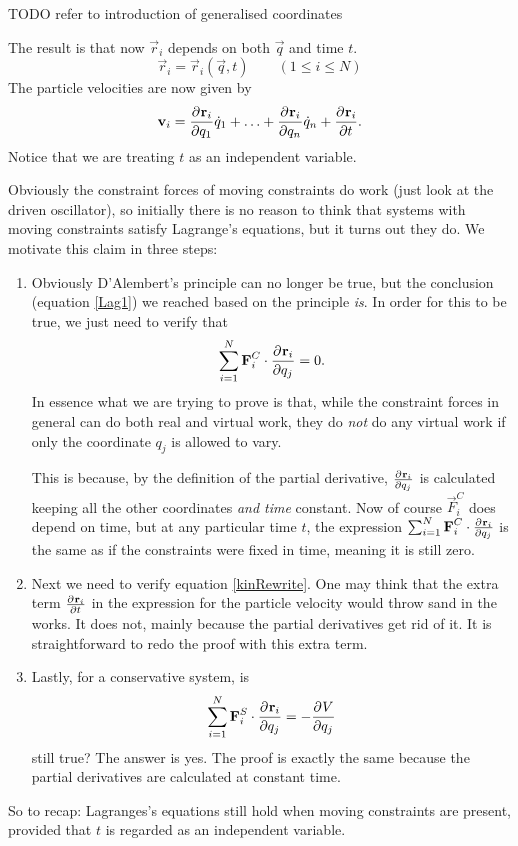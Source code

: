 TODO refer to introduction of generalised coordinates

The result is that now $\vec{r}_i$ depends on both $\vec{q}$ and time $t$.
\[ \vec{r}_i = \vec{r}_i(\vec{q}, t) \qquad (1 \leq i \leq N) \]
The particle velocities are now given by
\[ \bm{\mathrm{v}}_i =  \frac{\partial{^{}}\bm{\mathrm{r}}_i}{\partial{{q_1}^{}}} \dot{q}_1 + \ldots +  \frac{\partial{^{}}\bm{\mathrm{r}}_i}{\partial{{q_n}^{}}} \dot{q}_n +  \frac{\partial{^{}}\bm{\mathrm{r}}_i}{\partial{{t}^{}}} . \]
Notice that we are treating $t$ as an independent variable.

Obviously the constraint forces of moving constraints do work (just look at the driven oscillator), so initially there is no reason to think that systems with moving constraints satisfy Lagrange's equations, but it turns out they do. We motivate this claim in three steps:
\begin{enumerate}
\item Obviously D'Alembert's principle can no longer be true, but the conclusion (equation \ref{Lag1}) we reached based on the principle \textit{is}. In order for this to be true, we just need to verify that
\[ \sum^N_{i=1} \bm{\mathrm{F}}_i^C \cdot  \frac{\partial{^{}}\bm{\mathrm{r}}_i}{\partial{{q_j}^{}}}  = 0. \]
In essence what we are trying to prove is that, while the constraint forces in general can do both real and virtual work, they do \textit{not} do any virtual work if only the coordinate $q_j$ is allowed to vary.

This is because, by the definition of the partial derivative, $ \frac{\partial{^{}}\bm{\mathrm{r}}_i}{\partial{{q_j}^{}}} $ is calculated keeping all the other coordinates \textit{and time} constant. Now of course $\vec{F}_i^C$ does depend on time, but at any particular time $t$, the expression $\sum^N_{i=1} \bm{\mathrm{F}}_i^C \cdot  \frac{\partial{^{}}\bm{\mathrm{r}}_i}{\partial{{q_j}^{}}} $ is the same as if the constraints were fixed in time, meaning it is still zero.

\item Next we need to verify equation \ref{kinRewrite}. One may think that the extra term $ \frac{\partial{^{}}\bm{\mathrm{r}}_i}{\partial{{t}^{}}} $ in the expression for the particle velocity would throw sand in the works. It does not, mainly because the partial derivatives get rid of it. It is straightforward to redo the proof with this extra term.

\item Lastly, for a conservative system, is 
\[ \sum^N_{i=1}\bm{\mathrm{F}}^S_i \cdot  \frac{\partial{^{}}\bm{\mathrm{r}}_i}{\partial{{q_j}^{}}}  = -  \frac{\partial{^{}}V}{\partial{{q_j}^{}}}  \]
still true? The answer is yes. The proof is exactly the same because the partial derivatives are calculated at constant time.
\end{enumerate}
So to recap: Lagranges's equations still hold when moving constraints are present, provided that $t$ is regarded as an independent variable.

